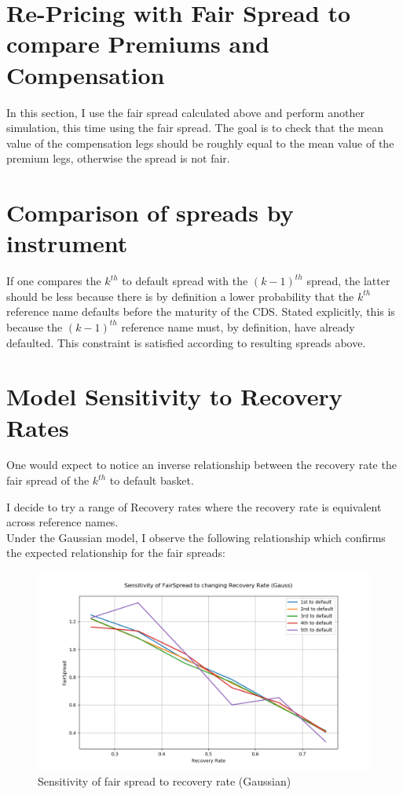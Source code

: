 \documentclass{report}
\theoremstyle{plain}
\theoremstyle{definition}
\begin{document}
\section{Re-Pricing with Fair Spread to compare Premiums and Compensation}
In this section, I use the fair spread calculated above and perform another simulation, this time using the fair spread. The goal is to check that the mean value of the compensation legs should be roughly equal to the mean value of the premium legs, otherwise the spread is not fair.

\section{Comparison of spreads by instrument}
If one compares the $k^{th}$ to default spread with the $(k-1)^{th}$ spread, the latter should be less because there is by definition a lower probability that the $k^{th}$ reference name defaults before the maturity of the CDS. Stated explicitly, this is because the $(k-1)^{th}$ reference name must, by definition, have already defaulted. This constraint is satisfied according to resulting spreads above.

\section{Model Sensitivity to Recovery Rates}
One would expect to notice an inverse relationship between the recovery rate the fair spread of the $k^{th}$ to default basket. 

I decide to try a range of Recovery rates where the recovery rate is equivalent across reference names. \\

Under the Gaussian model, I observe the following relationship which confirms the expected relationship for the fair spreads:

\begin{figure}[H]
	\begin{center}
		\includegraphics[width=15cm]{Sensitivity_of_FairSpread_to_changing_Recovery_Rate_(Gauss).png}
		\caption{Sensitivity of fair spread to recovery rate (Gaussian)} 
		\label{Sensitivity_of_FairSpread_to_changing_Recovery_Rate_(Gauss)}
	\end{center}
\end{figure}
\end{document}
